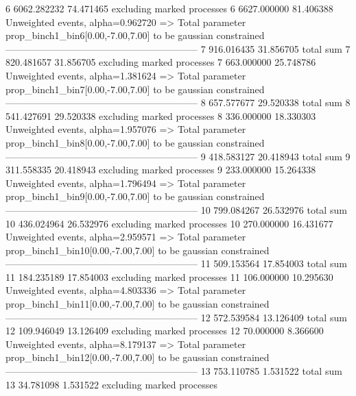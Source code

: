 6          6062.282232     74.471465       excluding marked processes    
6          6627.000000     81.406388       Unweighted events, alpha=0.962720
  => Total parameter prop_binch1_bin6[0.00,-7.00,7.00] to be gaussian constrained
------------------------------------------------------------
7          916.016435      31.856705       total sum                     
7          820.481657      31.856705       excluding marked processes    
7          663.000000      25.748786       Unweighted events, alpha=1.381624
  => Total parameter prop_binch1_bin7[0.00,-7.00,7.00] to be gaussian constrained
------------------------------------------------------------
8          657.577677      29.520338       total sum                     
8          541.427691      29.520338       excluding marked processes    
8          336.000000      18.330303       Unweighted events, alpha=1.957076
  => Total parameter prop_binch1_bin8[0.00,-7.00,7.00] to be gaussian constrained
------------------------------------------------------------
9          418.583127      20.418943       total sum                     
9          311.558335      20.418943       excluding marked processes    
9          233.000000      15.264338       Unweighted events, alpha=1.796494
  => Total parameter prop_binch1_bin9[0.00,-7.00,7.00] to be gaussian constrained
------------------------------------------------------------
10         799.084267      26.532976       total sum                     
10         436.024964      26.532976       excluding marked processes    
10         270.000000      16.431677       Unweighted events, alpha=2.959571
  => Total parameter prop_binch1_bin10[0.00,-7.00,7.00] to be gaussian constrained
------------------------------------------------------------
11         509.153564      17.854003       total sum                     
11         184.235189      17.854003       excluding marked processes    
11         106.000000      10.295630       Unweighted events, alpha=4.803336
  => Total parameter prop_binch1_bin11[0.00,-7.00,7.00] to be gaussian constrained
------------------------------------------------------------
12         572.539584      13.126409       total sum                     
12         109.946049      13.126409       excluding marked processes    
12         70.000000       8.366600        Unweighted events, alpha=8.179137
  => Total parameter prop_binch1_bin12[0.00,-7.00,7.00] to be gaussian constrained
------------------------------------------------------------
13         753.110785      1.531522        total sum                     
13         34.781098       1.531522        excluding marked processes    
